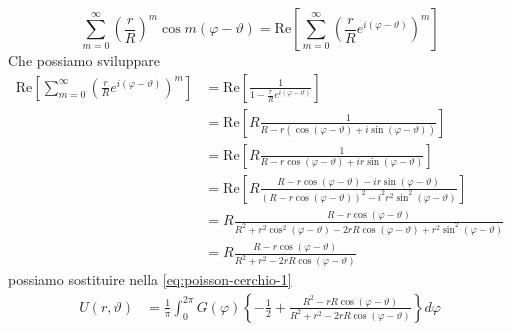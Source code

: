 \documentclass[10pt,a4paper,twoside,openright]{book}
\begin{document}
\begin{dimostrazione}
    \begin{equation*}
        \sum\limits ^{\infty }_{m=0}\left(\frac{r}{R}\right)^{m}\cos m(\varphi -\vartheta) =\mathrm{Re}\left[\sum\limits ^{\infty }_{m=0}\left(\frac{r}{R} e^{i(\varphi -\vartheta)}\right)^{m}\right]
    \end{equation*}
    Che possiamo sviluppare
    \begin{align*}
        \mathrm{Re}\left[\sum\limits ^{\infty }_{m=0}\left(\frac{r}{R} e^{i(\varphi -\vartheta)}\right)^{m}\right] & =\mathrm{Re}\left[\frac{1}{1-\frac{r}{R} e^{i(\varphi -\vartheta)}}\right]                                                                                            \\
                                                                                                                   & =\mathrm{Re}\left[ R\frac{1}{R-r(\cos(\varphi -\vartheta) +i\sin(\varphi -\vartheta))}\right]                                                                         \\
                                                                                                                   & =\mathrm{Re}\left[ R\frac{1}{R-r\cos(\varphi -\vartheta) +ir\sin(\varphi -\vartheta)}\right]                                                                          \\
                                                                                                                   & =\mathrm{Re}\left[ R\frac{R-r\cos(\varphi -\vartheta) -ir\sin(\varphi -\vartheta)}{(R-r\cos(\varphi -\vartheta))^{2} -i^{2} r^{2}\sin^{2}(\varphi -\vartheta)}\right] \\
                                                                                                                   & =R\frac{R-r\cos(\varphi -\vartheta)}{R^{2} +r^{2}\cos^{2}(\varphi -\vartheta) -2rR\cos(\varphi -\vartheta) +r^{2}\sin^{2}(\varphi -\vartheta)}                        \\
                                                                                                                   & =R\frac{R-r\cos(\varphi -\vartheta)}{R^{2} +r^{2} -2rR\cos(\varphi -\vartheta)}
    \end{align*}
    possiamo sostituire nella \eqref{eq:poisson-cerchio-1}
    \begin{align*}
        U(r,\vartheta) & =\frac{1}{\pi }\int ^{2\pi }_{0} G(\varphi)\left\{-\frac{1}{2} +\frac{R^{2} -rR\cos(\varphi -\vartheta)}{R^{2} +r^{2} -2rR\cos(\varphi -\vartheta)}\right\} d\varphi                                                            \\

\end{align*}
\end{dimostrazione}
\end{document}
